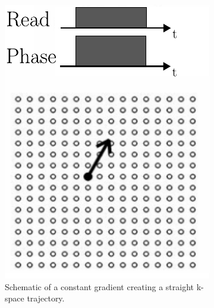 \begin{figure}[h] %
	\centering
	\begin{subfigure}{0.445\textwidth}
    		\includegraphics[width=\textwidth]{./Images/ConstantGradient.pdf}
    		\caption{Schematic of a constant gradient creating a straight k-space trajectory.}
    		\label{fig:constant_k-space_gradient}
	\end{subfigure}
	\hfill
	\begin{subfigure}{0.445\textwidth}

\end{subfigure}
\end{figure}
